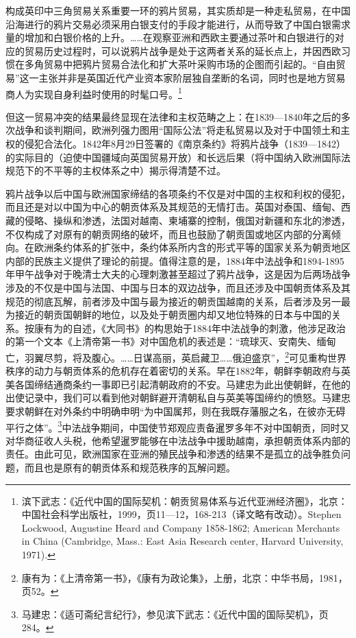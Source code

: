 \documentclass[a4paper, 12pt, openright]{ctexbook}
\renewenvironment{quote}
  {\list{}{\rightmargin2\ccwd \leftmargin2\ccwd \itemindent=2\ccwd \listparindent=2\ccwd}%
   \item\relax\small\kaishu\color{black}}
  {\endlist}
\begin{document}
\begin{quote}
构成英印中三角贸易关系重要一环的鸦片贸易，其实质却是一种走私贸易，在中国沿海进行的鸦片交易必须采用白银支付的手段才能进行，从而导致了中国白银需求量的增加和白银价格的上升。……在观察亚洲和西欧主要通过茶叶和白银进行的对应的贸易历史过程时，可以说鸦片战争是处于这两者关系的延长点上，并因西欧习惯在多角贸易中把鸦片贸易合法化和扩大茶叶采购市场的企图而引起的。“自由贸易”这一主张并非是英国近代产业资本家阶层独自垄断的名词，同时也是地方贸易商人为实现自身利益时使用的时髦口号。\footnote{滨下武志：《近代中国的国际契机：朝贡贸易体系与近代亚洲经济圈》，北京：中国社会科学出版社，1999，页11—12，168-213（译文略有改动）。Stephen Lockwood, Augustine Heard and Company 1858-1862; American Merchants in China (Cambridge, Mass.: East Asia Research center, Harvard University, 1971).}
\end{quote}

但这一贸易冲突的结果最终显现在法律和主权范畴之上：在1839—1840年之后的多次战争和谈判期间，欧洲列强力图用“国际公法”将走私贸易以及对于中国领土和主权的侵犯合法化。1842年8月29日签署的《南京条约》将鸦片战争（1839—1842）的实际目的（迫使中国疆域向英国贸易开放）和长远后果（将中国纳入欧洲国际法规范下的不平等的主权体系之中）揭示得清楚不过。

鸦片战争以后中国与欧洲国家缔结的各项条约不仅是对中国的主权和利权的侵犯，而且还是对以中国为中心的朝贡体系及其规范的无情打击。英国对泰国、缅甸、西藏的侵略、操纵和渗透，法国对越南、柬埔寨的控制，俄国对新疆和东北的渗透，不仅构成了对原有的朝贡网络的破坏，而且也鼓励了朝贡国或地区内部的分离倾向。在欧洲条约体系的扩张中，条约体系所内含的形式平等的国家关系为朝贡地区内部的民族主义提供了理论的前提。值得注意的是，1884年中法战争和1894-1895年甲午战争对于晚清士大夫的心理刺激甚至超过了鸦片战争，这是因为后两场战争涉及的不仅是中国与法国、中国与日本的双边战争，而且还涉及中国朝贡体系及其规范的彻底瓦解，前者涉及中国与最为接近的朝贡国越南的关系，后者涉及另一最为接近的朝贡国朝鲜的地位，以及处于朝贡圈内却又地位特殊的日本与中国的关系。按康有为的自述，《大同书》的构思始于1884年中法战争的刺激，他涉足政治的第一个文本《上清帝第一书》对中国危机的表述是：“琉球灭、安南失、缅甸亡，羽翼尽剪，将及腹心。……日谋高丽，英启藏卫……俄迫盛京”，\footnote{康有为：《上清帝第一书》，《康有为政论集》，上册，北京：中华书局，1981，页52。}可见重构世界秩序的动力与朝贡体系的危机存在着密切的关系。早在1882年，朝鲜李朝政府与英美各国缔结通商条约一事即已引起清朝政府的不安。马建忠为此出使朝鲜，在他的出使记录中，我们可以看到他对朝鲜避开清朝私自与英美等国缔约的愤怒。马建忠要求朝鲜在对外条约中明确申明“为中国属邦，则在我既存藩服之名，在彼亦无碍平行之体”。\footnote{马建忠：《适可斋纪言纪行》，参见滨下武志：《近代中国的国际契机》，页284。}中法战争期间，中国使节郑观应责备暹罗多年不对中国朝贡，同时又对华商征收人头税，他希望暹罗能够在中法战争中援助越南，承担朝贡体系内部的责任。由此可见，欧洲国家在亚洲的殖民战争和渗透的结果不是孤立的战争胜负问题，而且也是原有的朝贡体系和规范秩序的瓦解问题。
\end{document}
